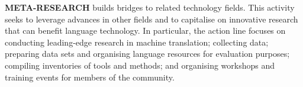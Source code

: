 \begin{multicols}{2}
\textbf{META-RESEARCH} builds bridges to related technology ﬁelds. This activity seeks to leverage advances in other ﬁelds and to capitalise on innovative research that can beneﬁt language technology. In particular, the action line focuses on conducting leading-edge research in machine translation; collecting data; preparing data sets and organising language resources for evaluation purposes; compiling inventories of tools and methods; and organising workshops and training events for members of the community.
\end{multicols}

\cleardoublepage

\appendix
{}



  
\cleardoublepage

\label{metanetmembers}

